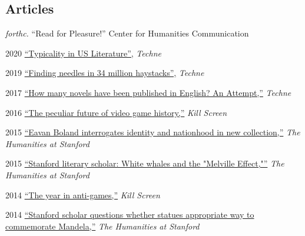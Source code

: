 \documentclass[12pt,letterpaper]{report}
\begin{document}
\subsection*{Articles}

\begin{tablist}
	\item[\emph{forthc.}] \tab{}\enquote{Read for Pleasure!} Center for Humanities Communication
	\item[2020] \tab{}\href{https://web.archive.org/web/20220430165427/https://litlab.stanford.edu/typicality-in-the-u-s-novel/}{\enquote{Typicality in US Literature},} \emph{Techne}
	\item[2019] \tab{}\href{https://web.archive.org/web/20220430054802/https://litlab.stanford.edu/finding-needles-in-34-million-haystacks/}{\enquote{Finding needles in 34 million haystacks},} \emph{Techne}
	\item[2017] \tab{}\href{https://web.archive.org/web/20220323072937/https://litlab.stanford.edu/how-many-novels-have-been-published-in-english-an-attempt/}{\enquote{How many novels have been published in English? An Attempt,}} \emph{Techne}
	\item[2016] \tab{}\href{https://web.archive.org/web/20230328175329/https://killscreen.com/previously/articles/the-peculiar-future-of-videogame-history/}{\enquote{The peculiar future of video game history,}} \emph{Kill Screen}
	\item[2015] \tab{}\href{https://web.archive.org/web/20210810123746/https://news.stanford.edu/news/2015/february/boland-country-book-022615.html}{\enquote{Eavan Boland interrogates identity and nationhood in new collection,}} \emph{The Humanities at Stanford}
	\item[2015] \tab{}\href{https://web.archive.org/web/20210810125202/https://news.stanford.edu/news/2015/may/melville-scholar-boone-051115.html}{\enquote{Stanford literary scholar: White whales and the "Melville Effect,"}} \emph{The Humanities at Stanford}
	\item[2014] \tab{} \href{https://web.archive.org/web/20231028015401/https://killscreen.com/previously/articles/year-anti-games/}{\enquote{The year in anti-games,}}
	\emph{Kill Screen}
	\item[2014] \tab{}\href{https://web.archive.org/web/20220611230152/https://news.stanford.edu/pr/2014/pr-mandela-statue-parker-120314.html}{\enquote{Stanford scholar questions whether statues appropriate way to commemorate Mandela,}} \emph{The Humanities at Stanford}
\end{tablist}
\end{document}
